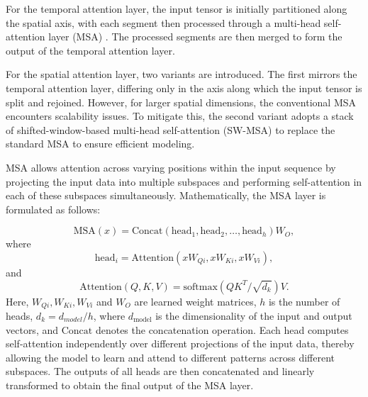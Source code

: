 \documentclass[review]{elsarticle}
\begin{document}


For the temporal attention layer, the input tensor is initially partitioned along the spatial axis, with each segment then processed through a multi-head self-attention layer (MSA) \citep{vaswani2017attention}. The processed segments are then merged to form the output of the temporal attention layer.


For the spatial attention layer, two variants are introduced. The first mirrors the temporal attention layer, differing only in the axis along which the input tensor is split and rejoined. However, for larger spatial dimensions, the conventional MSA encounters scalability issues. To mitigate this, the second variant adopts a stack of shifted-window-based multi-head self-attention (SW-MSA) \citep{liu2021swin} to replace the standard MSA to ensure efficient modeling.

MSA allows attention across varying positions within the input sequence by projecting the input data into multiple subspaces and performing self-attention in each of these subspaces simultaneously. Mathematically, the MSA layer is formulated as follows:



\begin{equation}
    \text{MSA}(x) = \text{Concat}(\text{head}_1, \text{head}_2, \ldots, \text{head}_h)W_O,
\end{equation}
where 
\begin{equation}
	\text{head}_i = \text{Attention}(xW_{Qi}, xW_{Ki}, xW_{Vi}),
\end{equation}
and
\begin{equation}
    \text{Attention}(Q, K, V) = \text{softmax}\left(QK^T/{\sqrt{d_k}}\right) V.
\end{equation}
Here, $W_{Qi}, W_{Ki}, W_{Vi}$ and $W_O$ are learned weight matrices, $h$ is the number of heads, $d_k=d_{model}/h$, where $d_{\text{model}}$ is the dimensionality of the input and output vectors, and $\text{Concat}$ denotes the concatenation operation. Each head computes self-attention independently over different projections of the input data, thereby allowing the model to learn and attend to different patterns across different subspaces. The outputs of all heads are then concatenated and linearly transformed to obtain the final output of the MSA layer. 
\end{document}
